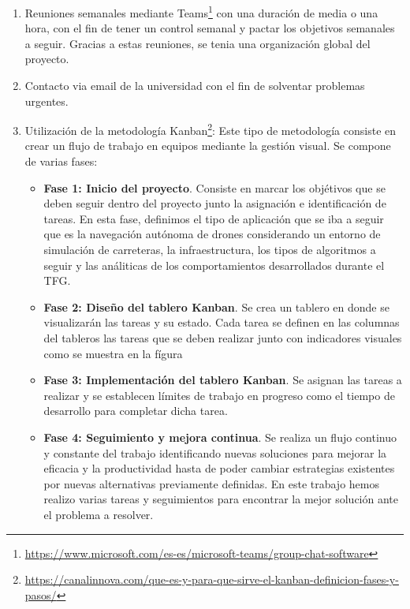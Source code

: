 \begin{enumerate}
    \item Reuniones semanales mediante Teams\footnote{\url{https://www.microsoft.com/es-es/microsoft-teams/group-chat-software}} con una duración de media o una hora, con el fin de tener un control semanal y pactar los objetivos semanales a seguir. Gracias a estas reuniones, se tenia una organización global del proyecto. 
    \item Contacto via email de la universidad con el fin de solventar problemas urgentes. 
    \item Utilización de la metodología Kanban\footnote{\url{https://canalinnova.com/que-es-y-para-que-sirve-el-kanban-definicion-fases-y-pasos/}}: Este tipo de metodología consiste en crear un flujo de trabajo
    en equipos mediante la gestión visual. Se compone de varias fases:
  
    \begin{itemize}
      \item \textbf{Fase 1: Inicio del proyecto}. Consiste en marcar los objétivos que se deben seguir dentro del proyecto junto la asignación e identificación de tareas. En esta fase, 
      definimos el tipo de aplicación que se iba a seguir que es la navegación autónoma de drones considerando un entorno de simulación de carreteras, la infraestructura, los tipos 
      de algoritmos a seguir y las análiticas de los comportamientos desarrollados durante el TFG. \newline
      \item \textbf{Fase 2: Diseño del tablero Kanban}. Se crea un tablero en donde se visualizarán las tareas y su estado. Cada tarea se definen en las columnas del tableros las
      tareas que se deben realizar junto con indicadores visuales como se muestra en la fígura \newline
      \item \textbf{Fase 3: Implementación del tablero Kanban}. Se asignan las tareas a realizar y se establecen límites de trabajo en progreso como el tiempo de desarrollo para 
      completar dicha tarea. \newline
      \item \textbf{Fase 4: Seguimiento y mejora continua}. Se realiza un flujo continuo y constante del trabajo identificando nuevas soluciones para mejorar la eficacia y la 
      productividad hasta de poder cambiar estrategias existentes por nuevas alternativas previamente definidas. En este trabajo hemos realizo varias tareas y seguimientos para encontrar
      la mejor solución ante el problema a resolver.\newline


\end{itemize}
\end{enumerate}
